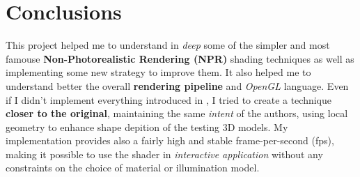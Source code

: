 \section{Conclusions}
This project helped me to understand in \textit{deep} some of the simpler and most famouse \textbf{Non-Photorealistic Rendering (NPR)} shading techniques as well as implementing some new strategy to improve them. \newline
It also helped me to understand better the overall \textbf{rendering pipeline} and \textit{OpenGL} language. Even if I didn't implement everything introduced in \cite{referencePaper}, I tried to create a technique \textbf{closer to the original}, maintaining the same \textit{intent} of the authors, using local geometry to enhance shape depition of the testing 3D models. \newline
My implementation provides also a fairly high and stable frame-per-second (fps), making it possible to use the shader in \textit{interactive application} without any constraints on the choice of material or illumination model. 
